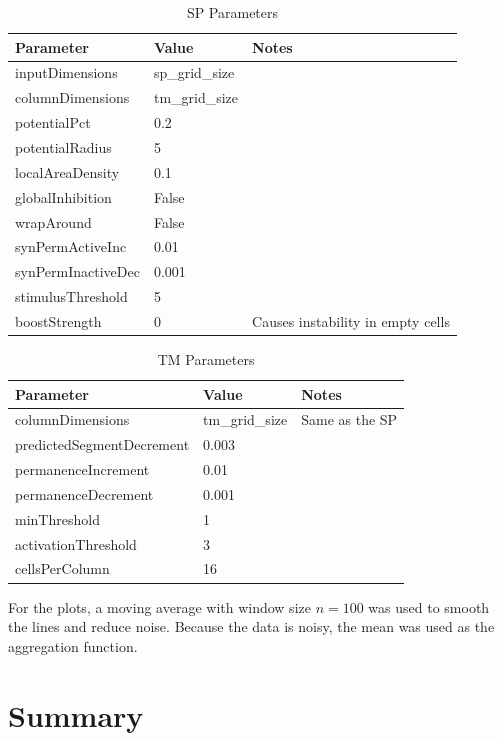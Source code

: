 \begin{table}[H]
    \centering
    \begin{tabularx}{\linewidth}{@{}XlX@{}}
        \toprule
        \textbf{Parameter} & \textbf{Value} & \textbf{Notes}                    \\
        \midrule
        inputDimensions    & sp\_grid\_size &                                   \\
        columnDimensions   & tm\_grid\_size &                                   \\
        potentialPct       & 0.2            &                                   \\
        potentialRadius    & 5              &                                   \\
        localAreaDensity   & 0.1            &                                   \\
        globalInhibition   & False          &                                   \\
        wrapAround         & False          &                                   \\
        synPermActiveInc   & 0.01           &                                   \\
        synPermInactiveDec & 0.001                                              \\
        stimulusThreshold  & 5              &                                   \\
        boostStrength      & 0              & Causes instability in empty cells \\
        \bottomrule
    \end{tabularx}
    \caption{SP Parameters}
    \label{tab:sperm_sp_param}
\end{table}
\begin{table}[H]
    \centering
    \begin{tabularx}{\linewidth}{@{}XlX@{}}
        \toprule
        \textbf{Parameter}        & \textbf{Value} & \textbf{Notes} \\
        \midrule
        columnDimensions          & tm\_grid\_size & Same as the SP \\
        predictedSegmentDecrement & 0.003          &                \\
        permanenceIncrement       & 0.01           &                \\
        permanenceDecrement       & 0.001          &                \\
        minThreshold              & 1              &                \\
        activationThreshold       & 3              &                \\
        cellsPerColumn            & 16             &                \\
        \bottomrule
    \end{tabularx}
    \caption{TM Parameters}
    \label{tab:sperm_tm_param}
\end{table}
For the plots, a moving average with window size $n=100$ was used to smooth the lines and reduce noise. Because the data is noisy, the mean was used as the aggregation function.
\section{Summary}